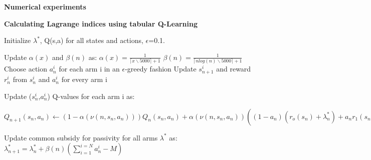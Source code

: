 \documentclass{slides}
\begin{document}
{\large \color{144}

\begin{center}
\textbf{\Large Numerical experiments}
\end{center}
\newpage
\textbf{Calculating Lagrange indices using tabular Q-Learning}
\begin{algorithm}[H]
\begin{small}
\begin{algorithmic}[1]
    \State Initialize $\lambda^*$, Q(s,a) for all states and actions, $\epsilon$=0.1.


        \State Update $\alpha(x)$ and $\beta(n)$ as:
        $\alpha(x)=\frac{1}{\lceil{x\backslash5000}\rceil+1}$ $\beta(n)=\frac{1}{\lceil{nlog(n)\backslash5000}\rceil+1}$
        \State Choose action $a_{n}^i$ for each arm i in an $\epsilon$-greedy fashion
        \State Update $s_{n+1}^i$ and reward $r_n^i$ from $s_{n}^i$ and $a_{n}^i$ for every arm i
        
        \State Update ($s_n^i$,$a_n^i$) Q-values for each arm i as:
        \Statex\begin{small}$Q_{n+1}(s_n,a_n)\gets(1-\alpha(\nu(n,s_n,a_n)))Q_n(s_n,a_n)+\alpha(\nu(n,s_n,a_n))((1-a_n)(r_o(s_n)+\lambda_n^*)+a_nr_1(s_n)+\underset{v\epsilon\{0,1\}}{max}Q_n(s_{n+1},v)-\frac{1}{2d}\sum\limits_{k\in S}Q_n(k,0)+Q_n(k,1))$\end{small}
        \State Update common subsidy for passivity for all arms $\lambda^*$ as: $\lambda_{n+1}^*=\lambda_n^*+\beta(n)(\sum\limits_{i=1}^{i=N}a_n^i-M)$
        

\end{algorithmic}
\end{small}
\end{algorithm}}
\end{document}
